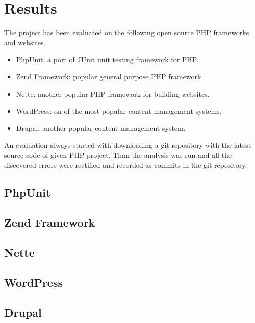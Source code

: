 \chapter{Results}

The project has been evaluated on the following open source PHP frameworks and 
websites.

\begin{itemize}
    \item PhpUnit: a port of JUnit unit testing framework for PHP. 
    \item Zend Framework: popular general purpose PHP framework.
    \item Nette: another popular PHP framework for building websites.
    \item WordPress: on of the most popular content management systems.
    \item Drupal: another popular content management system.
\end{itemize}

An evaluation always started with downloading a git repository with the 
latest source code of given PHP project. Than the analysis was run and 
all the discovered errors were rectified and recorded as commits in 
the git repository. 

\section{PhpUnit}

\section{Zend Framework}

\section{Nette}

\section{WordPress}

\section{Drupal}

